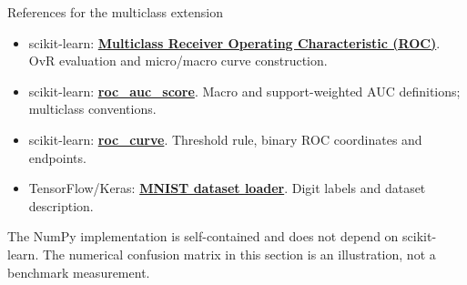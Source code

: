 \documentclass[aspectratio=169,11pt]{beamer}
\begin{document}
\begin{frame}{References for the multiclass extension}
\small
\begin{itemize}
\item scikit-learn: \href{https://scikit-learn.org/stable/auto_examples/model_selection/plot_roc.html}{\textbf{Multiclass Receiver Operating Characteristic (ROC)}}.
      OvR evaluation and micro/macro curve construction.
\item scikit-learn: \href{https://scikit-learn.org/stable/modules/generated/sklearn.metrics.roc_auc_score.html}{\textbf{roc\_auc\_score}}.
      Macro and support-weighted AUC definitions; multiclass conventions.
\item scikit-learn: \href{https://scikit-learn.org/stable/modules/generated/sklearn.metrics.roc_curve.html}{\textbf{roc\_curve}}.
      Threshold rule, binary ROC coordinates and endpoints.
\item TensorFlow/Keras: \href{https://www.tensorflow.org/api_docs/python/tf/keras/datasets/mnist/load_data}{\textbf{MNIST dataset loader}}.
      Digit labels and dataset description.
\end{itemize}
\vspace{1em}
The NumPy implementation is self-contained and does not depend on
scikit-learn. The numerical confusion matrix in this section is an
illustration, not a benchmark measurement.
\end{frame}
\end{document}
